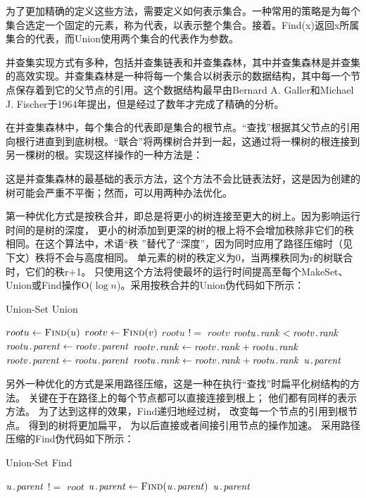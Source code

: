 为了更加精确的定义这些方法，需要定义如何表示集合。一种常用的策略是为每个集合选定一个固定的元素，称为代表，以表示整个集合。接着。Find(x)返回x所属集合的代表，而Union使用两个集合的代表作为参数。


并查集实现方式有多种，包括并查集链表和并查集森林，其中并查集森林是并查集的高效实现。并查集森林是一种将每一个集合以树表示的数据结构，其中每一个节点保存着到它的父节点的引用。这个数据结构最早由Bernard A. Galler和Michael J. Fischer于1964年提出，但是经过了数年才完成了精确的分析。

在并查集森林中，每个集合的代表即是集合的根节点。“查找”根据其父节点的引用向根行进直到到底树根。“联合”将两棵树合并到一起，这通过将一棵树的根连接到另一棵树的根。实现这样操作的一种方法是：

这是并查集森林的最基础的表示方法，这个方法不会比链表法好，这是因为创建的树可能会严重不平衡；然而，可以用两种办法优化。

第一种优化方式是按秩合并，即总是将更小的树连接至更大的树上。因为影响运行时间的是树的深度，
更小的树添加到更深的树的根上将不会增加秩除非它们的秩相同。在这个算法中，术语“秩
”替代了“深度”，因为同时应用了路径压缩时（见下文）秩将不会与高度相同。
单元素的树的秩定义为0，当两棵秩同为r的树联合时，它们的秩r+1。
只使用这个方法将使最坏的运行时间提高至每个MakeSet、
Union或Find操作O($\log n$)。采用按秩合并的Union伪代码如下所示：
\begin{algorithm} 
	\caption {Union-Set Union} 
	\begin{codebox}
\li			$rootu \leftarrow \textnormal{\scshape Find}(u)$
\li			$rootv \leftarrow \textnormal{\scshape Find}(v)$
\li			\If	$rootu$ $!=$ $rootv$
\li				\Then
					\If $\attribii{rootu}{rank} < \attribii{rootv}{rank}$
\li						\Then
							$\attribii{rootu}{parent} \leftarrow \attribii{rootv}{parent}$
\li							$\attribii{rootv}{rank} \leftarrow \attribii{rootv}{rank} + \attribii{rootu}{rank}$
\li						\Else
\li							$\attribii{rootv}{parent} \leftarrow \attribii{rootu}{parent}$
\li							$\attribii{rootu}{rank} \leftarrow  \attribii{rootv}{rank} + \attribii{rootu}{rank}$
						\End
				\End
\li			\Return	$\attribii{u}{parent}$
	\end{codebox}
\end{algorithm} 

另外一种优化的方式是采用路径压缩，这是一种在执行“查找”时扁平化树结构的方法。
关键在于在路径上的每个节点都可以直接连接到根上；
他们都有同样的表示方法。
为了达到这样的效果，Find递归地经过树，
改变每一个节点的引用到根节点。
得到的树将更加扁平，
为以后直接或者间接引用节点的操作加速。
采用路径压缩的Find伪代码如下所示：
\begin{algorithm} 
	\caption {Union-Set Find} 
	\begin{codebox}
		\Procname{$\proc{Find}(u)$}
\li			\If $\attribii{u}{parent}$ $!=$ $root$
\li			\Then	$\attribii{u}{parent} \leftarrow \proc{Find}(\attribii{u}{parent})$ \End
\li			\Return	$\attribii{u}{parent}$
	\end{codebox}
\end{algorithm} 

